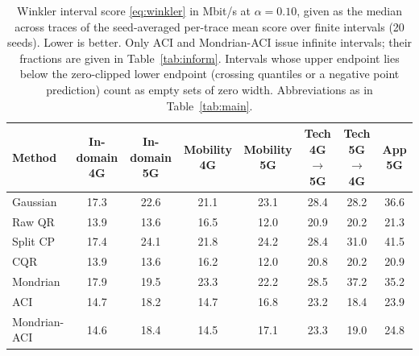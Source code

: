 \begin{table}[!t]
\caption{Winkler interval score \eqref{eq:winkler} in Mbit/s at $\alpha=0.10$, given as the median across traces of the seed-averaged per-trace mean score over finite intervals (20 seeds). Lower is better. Only ACI and Mondrian-ACI issue infinite intervals; their fractions are given in Table~\ref{tab:inform}. Intervals whose upper endpoint lies below the zero-clipped lower endpoint (crossing quantiles or a negative point prediction) count as empty sets of zero width. Abbreviations as in Table~\ref{tab:main}.}
\label{tab:winkler}
\centering
\footnotesize
\setlength{\tabcolsep}{4pt}
\begin{tabular}{lccccccc}
\toprule
Method & In-domain 4G & In-domain 5G & Mobility 4G & Mobility 5G & Tech 4G$\rightarrow$5G & Tech 5G$\rightarrow$4G & App 5G \\
\midrule
Gaussian & 17.3 & 22.6 & 21.1 & 23.1 & 28.4 & 28.2 & 36.6 \\
Raw QR & 13.9 & 13.6 & 16.5 & 12.0 & 20.9 & 20.2 & 21.3 \\
Split CP & 17.4 & 24.1 & 21.8 & 24.2 & 28.4 & 31.0 & 41.5 \\
CQR & 13.9 & 13.6 & 16.2 & 12.0 & 20.8 & 20.2 & 20.9 \\
Mondrian & 17.9 & 19.5 & 23.3 & 22.2 & 28.5 & 37.2 & 35.2 \\
ACI & 14.7 & 18.2 & 14.7 & 16.8 & 23.2 & 18.4 & 23.9 \\
Mondrian-ACI & 14.6 & 18.4 & 14.5 & 17.1 & 23.3 & 19.0 & 24.8 \\
\bottomrule
\end{tabular}
\end{table}
